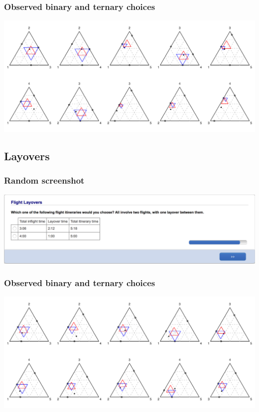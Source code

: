 \documentclass[11pt,letter]{article}
\begin{document}
\subsubsection*{Observed binary and ternary choices}

\includegraphics[width=15cm]{./Population_study_data/Simplexes/Restaurants.pdf}

\pagebreak

\subsection{Layovers}



\subsubsection*{Random screenshot}

\includegraphics[width=15cm]{Population_study_design/screenshot_Flight_Layovers.png}

\subsubsection*{Observed binary and ternary choices}

\includegraphics[width=15cm]{./Population_study_data/Simplexes/Flight_layovers.pdf}
\end{document}
